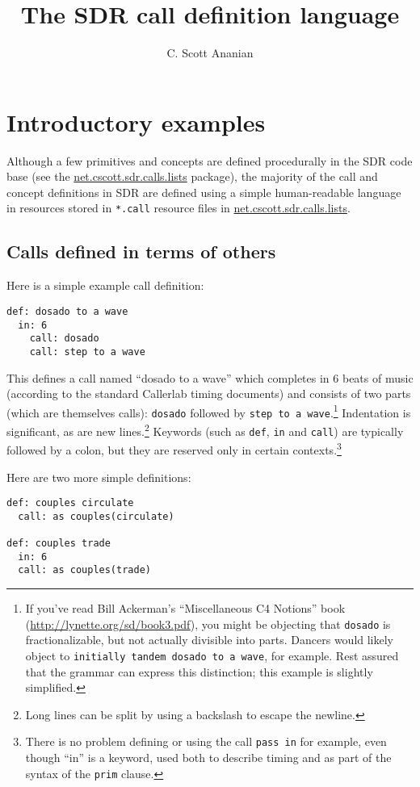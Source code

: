 \documentclass[12pt]{article}
\title{The SDR call definition language}
\author{C. Scott Ananian}
\date{}
\newcommand{\clause}[1]{\texttt{#1}}
\renewcommand{\call}[1]{\texttt{#1}} %
\newcommand{\package}[1]{\url{#1}}
\begin{document}
\maketitle

\section{Introductory examples}

Although a few primitives and concepts are defined procedurally in the
SDR code base (see the \package{net.cscott.sdr.calls.lists}
package), the majority of the call and concept definitions in SDR are
defined using a simple human-readable language in resources stored
in \texttt{*.call} resource files in \package{net.cscott.sdr.calls.lists}.

\subsection{Calls defined in terms of others}
Here is a simple example call definition:
\begin{lstlisting}
def: dosado to a wave
  in: 6
    call: dosado
    call: step to a wave
\end{lstlisting}

This defines a call named ``dosado to a wave'' which completes in 6
beats of music (according to the standard Callerlab timing documents)
and consists of two parts (which are themselves calls): \call{dosado}
followed by \call{step to a wave}.\footnote{If you've read Bill
  Ackerman's ``Miscellaneous C4 Notions'' book
  (\url{http://lynette.org/sd/book3.pdf}), you might be objecting that
  \call{dosado} is fractionalizable, but not actually divisible into
  parts.  Dancers would likely object to \call{initially tandem dosado
    to a wave}, for example.  Rest assured that the grammar can
  express this distinction; this example is slightly simplified.}
Indentation is significant, as are new lines.\footnote{Long lines can
  be split by using a backslash to escape the newline.}
Keywords (such as \clause{def}, \clause{in} and \clause{call}) are
typically followed by a colon, but they are reserved only in certain
contexts.\footnote{There is no problem defining or using the call
  \call{pass in} for example, even though ``in'' is a keyword, used both
  to describe timing and as part of the syntax of the \clause{prim}  clause.}

Here are two more simple definitions:
\begin{lstlisting}
def: couples circulate
  call: as couples(circulate)

def: couples trade
  in: 6
  call: as couples(trade)
\end{lstlisting}
\end{document}
